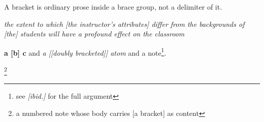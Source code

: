 A bracket is ordinary prose inside a brace group, not a delimiter of it.

\emph{the extent to which [the instructor's attributes] differ from the backgrounds of [the] students will have a profound effect on the classroom}

\textbf{a [b] c} and \emph{a [[doubly bracketed]] atom} and a note\footnote{see
\emph{[ibid.]} for the full argument}.

\footnote[3]{a numbered note whose body carries [a bracket] as content}
